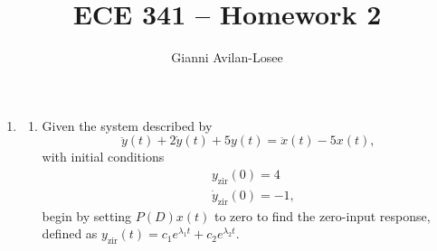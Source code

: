\documentclass{article}
\title{ECE 341 -- Homework 2}
\author{Gianni Avilan-Losee}
\begin{document}

\begin{enumerate}[label=\thesubsubsection]
\setcounter{section}{2}
\setcounter{subsection}{2}
\setcounter{subsubsection}{1}
\item
\begin{enumerate}[label=(\alph*), start=2]
	\item Given the system described by 
		\[
		\ddot{y}(t) + 2\dot{y}(t) + 5y(t) = \ddot{x}(t) - 5x(t),
		\]
		with initial conditions
		\begin{align*}
		 &y_{\mathrm{zir}}(0) = 4 \\
		 &\dot{y}_{\mathrm{zir}}(0) = -1,
		\end{align*}
		begin by setting \(P(D)x(t)\) to zero to find the zero-input response, defined as \(y_{\mathrm{zir}}(t) = c_1e^{\lambda_1 t} + c_2e^{\lambda_2 t}.\)


\end{enumerate}
\end{enumerate}
\end{document}

